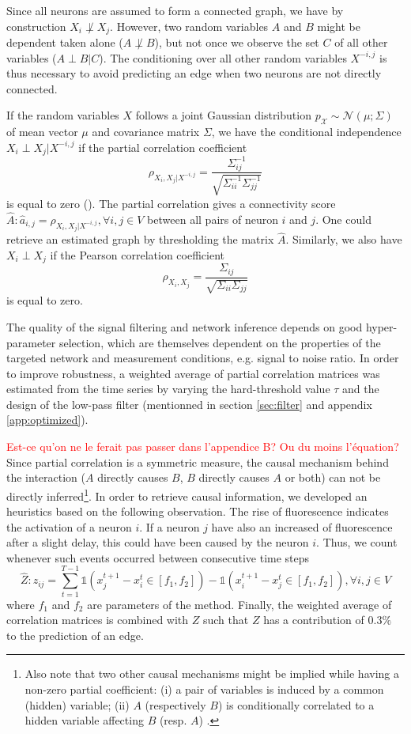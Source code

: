 \documentclass[wcp]{jmlr}
\begin{document}
Since all neurons are assumed to form a connected graph, we
have by construction $X_i \not\perp X_j$. However, two random variables $A$ and $B$ might be
dependent taken alone ($A \not\perp B$), but not once we observe the set  $C$
of all other variables ($A \perp B | C$). The conditioning over all other
random variables $X^{-i,j}$ is thus necessary to avoid predicting an edge when
two neurons are not directly connected.

If the random variables $X$ follows a joint Gaussian distribution
$p_\mathcal{X} \sim \mathcal{N}(\mu; \Sigma)$ of mean vector $\mu$ and
covariance matrix $\Sigma$, we have the conditional independence
$X_i \perp X_j | X^{-i,j}$ if the partial correlation coefficient
\[
\rho_{X_i, X_j | X^{-i,j}}
= \frac{\Sigma^{-1}_{ij}}{\sqrt{\Sigma^{-1}_{ii} \Sigma^{-1}_{jj}}}
\]
is equal to zero (\cite{koller2009probabilistic}). The partial correlation gives
a connectivity score
$\hat{A}: \hat{a}_{i,j} = \rho_{X_i, X_j | X^{-i,j}}, \forall i, j \in V$ between all
pairs of neuron $i$ and $j$. One could retrieve an estimated graph by thresholding
the matrix $\hat{A}$.
Similarly, we also have $X_i \perp X_j$ if the Pearson correlation
coefficient
\[
\rho_{X_i,X_j} = \frac{\Sigma_{ij}}{\sqrt{\Sigma_{ii}
\Sigma_{jj}}}
\]
is equal to zero.

The quality of the signal filtering and network inference depends on
good hyper-parameter selection, which are themselves dependent on the properties
of the targeted network and measurement conditions, e.g. signal to noise ratio.
In order to improve robustness, a weighted average of partial correlation
matrices was estimated from the time series by varying the hard-threshold value
$\tau$ and the design of the low-pass filter (mentionned in section \ref{sec:filter} and appendix \ref{app:optimized}).


\textcolor{red}{Est-ce qu'on ne le ferait pas passer dans l'appendice B? Ou du moins l'équation?}
Since partial correlation is a symmetric measure, the causal mechanism behind the
interaction ($A$ directly causes $B$, $B$ directly causes $A$ or both) can not
be directly inferred\footnote{Also note that two other causal mechanisms might be
implied while having a non-zero partial coefficient: (i) a pair of variables
is induced by a common (hidden) variable; (ii) $A$ (respectively $B$) is
conditionally correlated to a hidden variable affecting $B$ (resp. $A$)
\cite{de2004discovery}.}.
In order to retrieve causal information, we developed an
heuristics based on the following observation. The rise of fluorescence
indicates the activation of a neuron $i$. If a neuron $j$ have also
an increased of fluorescence after a slight delay, this could have been
caused by the neuron $i$. Thus, we count whenever
such events occurred between consecutive time steps
\[
\hat{Z}: z_{ij} = \sum_{t=1}^{T - 1}
    \mathbb{1}(x_j^{t+1} - x_i^t \in \left[f_1, f_2 \right]) -
    \mathbb{1}(x_i^{t+1} - x_j^t \in \left[f_1, f_2 \right]), \forall i, j \in V
\]
where $f_1$ and $f_2$ are parameters of the method.
Finally, the weighted average of correlation matrices is combined with $Z$ such
that $Z$ has a contribution of $0.3\%$ to the prediction of an edge.
\end{document}

